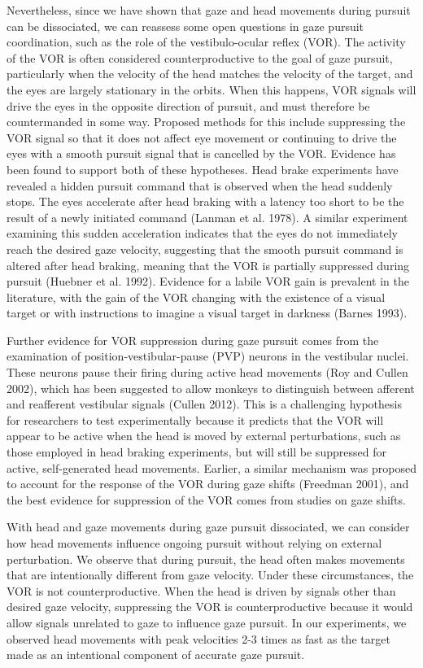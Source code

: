 \documentclass[12pt]{article}
\begin{document}
Nevertheless, since we have shown that gaze and head movements during pursuit can be dissociated, we can reassess some open questions in gaze pursuit coordination, such as the role of the vestibulo-ocular reflex (VOR). The activity of the VOR is often considered counterproductive to the goal of gaze pursuit, particularly when the velocity of the head matches the velocity of the target, and the eyes are largely stationary in the orbits. When this happens, VOR signals will drive the eyes in the opposite direction of pursuit, and must therefore be countermanded in some way. Proposed methods for this include suppressing the VOR signal so that it does not affect eye movement or continuing to drive the eyes with a smooth pursuit signal that is cancelled by the VOR. Evidence has been found to support both of these hypotheses. Head brake experiments have revealed a hidden pursuit command that is observed when the head suddenly stops. The eyes accelerate after head braking with a latency too short to be the result of a newly initiated command (Lanman et al. 1978). A similar experiment examining this sudden acceleration indicates that the eyes do not immediately reach the desired gaze velocity, suggesting that the smooth pursuit command is altered after head braking, meaning that the VOR is partially suppressed during pursuit (Huebner et al. 1992). Evidence for a labile VOR gain is prevalent in the literature, with the gain of the VOR changing with the existence of a visual target or with instructions to imagine a visual target in darkness (Barnes 1993). 

Further evidence for VOR suppression during gaze pursuit comes from the examination of position-vestibular-pause (PVP) neurons in the vestibular nuclei. These neurons pause their firing during active head movements (Roy and Cullen 2002), which has been suggested to allow monkeys to distinguish between afferent and reafferent vestibular signals (Cullen 2012). This is a challenging hypothesis for researchers to test experimentally because it predicts that the VOR will appear to be active when the head is moved by external perturbations, such as those employed in head braking experiments, but will still be suppressed for active, self-generated head movements. Earlier, a similar mechanism was proposed to account for the response of the VOR during gaze shifts (Freedman 2001), and the best evidence for suppression of the VOR comes from studies on gaze shifts.

With head and gaze movements during gaze pursuit dissociated, we can consider how head movements influence ongoing pursuit without relying on external perturbation. We observe that during pursuit, the head often makes movements that are intentionally different from gaze velocity. Under these circumstances, the VOR is not counterproductive. When the head is driven by signals other than desired gaze velocity, suppressing the VOR is counterproductive because it would allow signals unrelated to gaze to influence gaze pursuit. In our experiments, we observed head movements with peak velocities 2-3 times as fast as the target made as an intentional component of accurate gaze pursuit. 
\end{document}
